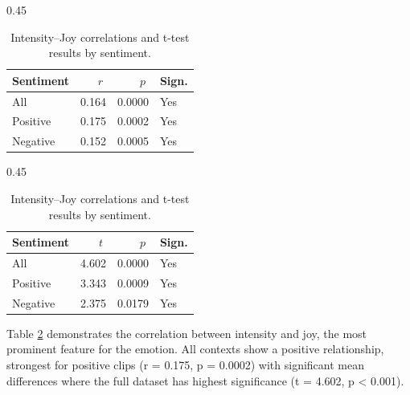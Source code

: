   
  
  \begin{table}[H]
    \centering
  
    \begin{subtable}{0.45\textwidth}
      \centering
      \caption{Intensity and Joy (r)}\label{tab:rq1_corr_intensity_joy}
      \begin{tabular}{l r r l}
        \toprule
        Sentiment & \(\;r\;\) & \(\;p\;\) & Sign. \\
        \midrule
        All        & 0.164        & 0.0000    & Yes         \\
        Positive   & 0.175        & 0.0002    & Yes         \\
        Negative   & 0.152        & 0.0005    & Yes         \\
        \bottomrule
      \end{tabular}
    \end{subtable}\hfill
    \begin{subtable}{0.45\textwidth}
      \centering
      \caption{Intensity and Joy (t-test)}\label{tab:rq1_ttest_intensity_joy}
      \begin{tabular}{l r r l}
        \toprule
        Sentiment & \(\;t\;\) & \(\;p\;\) & Sign. \\
        \midrule
        All        & 4.602        & 0.0000    & Yes         \\
        Positive   & 3.343        & 0.0009    & Yes         \\
        Negative   & 2.375        & 0.0179    & Yes         \\

        \bottomrule
      \end{tabular}
    \end{subtable}
  
    \caption{Intensity–Joy correlations and t-test results by sentiment.}
    \label{tab:rq1_intensity_joy_side_by_side}
  \end{table}
Table \ref{tab:rq1_intensity_joy_side_by_side} demonstrates the correlation between intensity and joy, the most prominent feature for the emotion.
All contexts show a positive relationship, strongest for positive clips (r = 0.175, p = 0.0002) with significant mean differences where the full dataset has highest significance (t = 4.602, p < 0.001). 
